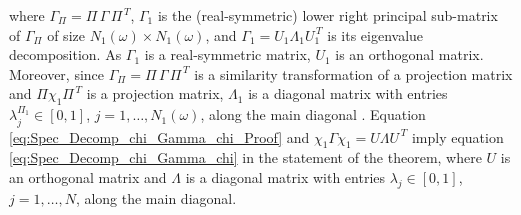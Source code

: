 \documentclass{cmslatex}
\begin{document}
%
where $\Gamma_\Pi=\Pi\,\Gamma\,\Pi^{\,T}$, $\Gamma_1$ is the (real-symmetric) lower right
principal sub-matrix of $\Gamma_\Pi$ of size $N_1(\omega)\times N_1(\omega)$, and 
$\Gamma_1=U_1\Lambda_1U_1^{\,T}$ is its eigenvalue decomposition. As $\Gamma_1$ is a
real-symmetric matrix, $U_1$ is an orthogonal matrix. Moreover, since
$\Gamma_\Pi=\Pi\,\Gamma\,\Pi^{\,T}$ is a similarity transformation of a projection matrix
and $\Pi\chi_1\Pi^{\,T}$ is a projection matrix, $\Lambda_1$ is a diagonal matrix
with entries $\lambda_j^{\Pi_1}\in[0,1]$, $j=1,\ldots,N_1 (\omega)$, along the main diagonal
\cite{Demmel:1997}. Equation
\eqref{eq:Spec_Decomp_chi_Gamma_chi_Proof} and $\chi_1\Gamma\chi_1=U\Lambda U^{\,T}$ 
imply equation \eqref{eq:Spec_Decomp_chi_Gamma_chi} in the statement
of the theorem, where $U$ is an orthogonal matrix and $\Lambda$ is a
diagonal matrix with entries $\lambda_j\in[0,1]$, $j=1,\ldots,N$, along the main
diagonal.    
\end{document}
